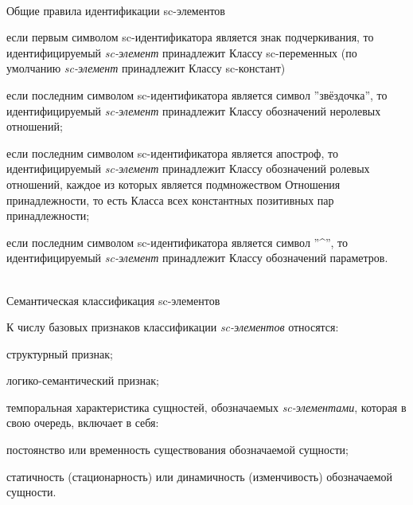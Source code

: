 \begin{frame}{\\Общие правила идентификации sc-элементов}
	\vspace{10mm}
	\begin{SCn}
			\begin{textitemize}
				\item если первым символом sc-идентификатора является знак подчеркивания, то идентифицируемый \textit{sc-элемент} принадлежит Классу sc-переменных (по умолчанию \textit{sc-элемент} принадлежит Классу sc-констант)
				\item если последним символом sc-идентификатора является символ ''звёздочка'', то идентифицируемый \textit{sc-элемент} принадлежит Классу обозначений неролевых отношений;
				\item если последним символом sc-идентификатора является апостроф, то идентифицируемый \textit{sc-элемент} принадлежит Классу обозначений ролевых отношений, каждое из которых является подмножеством Отношения принадлежности, то есть Класса всех константных позитивных пар принадлежности;
				\item если последним символом sc-идентификатора является символ ''\textasciicircum'', то идентифицируемый \textit{sc-элемент} принадлежит Классу обозначений параметров.
			\end{textitemize}
	\end{SCn}
\end{frame}

\begin{frame}{\\Семантическая классификация sc-элементов}

К числу базовых признаков классификации \textit{sc-элементов} относятся:
\begin{textitemize}
	\item структурный признак;
	\item логико-семантический признак;
	\item темпоральная характеристика сущностей, обозначаемых \textit{sc-элементами}, которая в свою очередь, включает в себя:
	\begin{textitemize}
		\item постоянство или временность существования обозначаемой сущности;
		\item статичность (стационарность) или динамичность (изменчивость) обозначаемой сущности.
	\end{textitemize}
\end{textitemize}
\end{frame}

